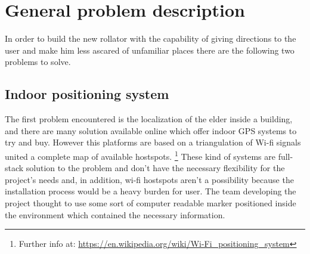 \chapter{General problem description}

In order to build the new rollator with the capability of giving directions to
the user and make him less ascared of unfamiliar places there are the following
two problems to solve.

\section{Indoor positioning system}
The first problem encountered is the localization of the elder inside a
building, and there are many solution available online which offer indoor 
GPS systems to try and buy.
However this platforms are based on a triangulation of Wi-fi signals united a
complete map of available hostspots.
\footnote{Further info at:
\url{https://en.wikipedia.org/wiki/Wi-Fi_positioning_system}}
These kind of systems are full-stack solution to the problem and don't have the
necessary flexibility for the project's needs and, in addition, wi-fi hostspots 
aren't a possibility because the installation process would be a heavy burden
for user.
\newline
The team developing the project thought to use some sort of computer readable 
marker positioned inside the environment which contained the necessary information.
    














  
